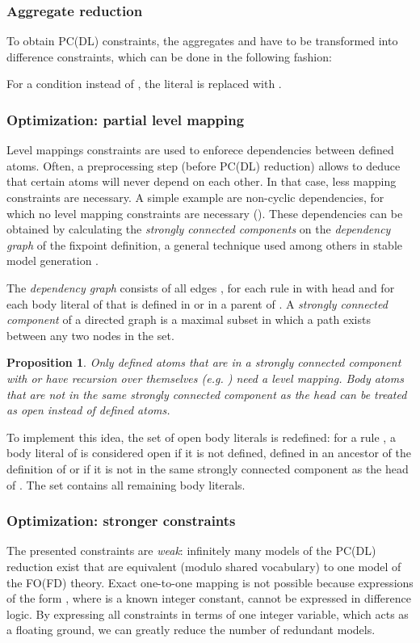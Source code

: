 \documentclass{tlp}
\newtheorem{proposition}[lemma]{Proposition}
\begin{document}
\subsubsection{Aggregate reduction}
To obtain PC(DL) constraints, the aggregates  and  have to be transformed into difference constraints, which can be done in the following fashion:



For a condition  instead of , the literal  is replaced with .

\subsubsection{Optimization: partial level mapping}
Level mappings constraints are used to enforece dependencies between defined atoms. Often, a preprocessing step (before PC(DL) reduction) allows to deduce that certain atoms will never depend on each other. In that case, less mapping constraints are necessary. A simple example are non-cyclic dependencies, for which no level mapping constraints are necessary (). These dependencies can be obtained by calculating the \emph{strongly connected components} \cite{siamcomp/Tarjan72} on the \emph{dependency graph} of the fixpoint definition, a general technique used among others in stable model generation \cite{lpnmr/SyrjanenN01}.

The \emph{dependency graph} consists of all edges , for each rule  in  with head  and for each body literal  of  that is defined in  or in a parent of . A \emph{strongly connected component} of a directed graph is a maximal subset in which a path exists between any two nodes in the set.

\begin{proposition}
Only defined atoms that are in a strongly connected component with  or have recursion over themselves (e.g. ) need a level mapping. Body atoms that are not in the same strongly connected component as the head can be treated as open instead of defined atoms.
\end{proposition}

To implement this idea, the set of open body literals  is redefined: for a rule , a body literal of  is considered open if it is not defined, defined in an ancestor of the definition of  or if it is not in the same strongly connected component as the head of . The set  contains all remaining body literals.

\subsubsection{Optimization: stronger constraints}
The presented constraints are \emph{weak}: infinitely many models of the PC(DL) reduction exist that are equivalent (modulo shared vocabulary) to one model of the FO(FD) theory. Exact one-to-one mapping is not possible because expressions of the form , where  is a known integer constant, cannot be expressed in difference logic. By expressing all constraints in terms of one integer variable, which acts as a floating ground, we can greatly reduce the number of redundant models.
\end{document}
